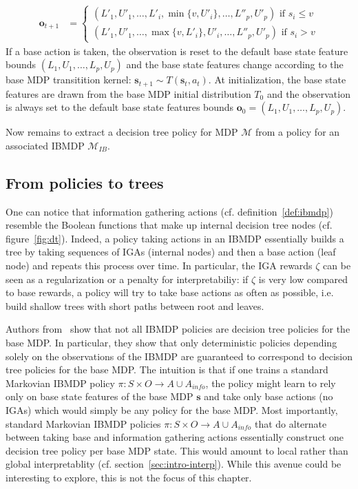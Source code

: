 \begin{definition}
\begin{itemize}
\begin{align*}
    \boldsymbol{o}_{t+1} &= \begin{cases}
        (L'_1, U'_1, \dots , L'_i, \min\{v, U'_i\}, \dots , L''_p, U'_p) \text{ if } s_i \leq v\\
        (L'_1, U'_1, \dots , \max\{v, L'_i\}, U'_i, \dots , L''_p, U'_p) \text{ if } s_i > v
    \end{cases}
\end{align*}
If a base action is taken, the observation is reset to the default base state feature bounds $(L_1, U_1,\dots, L_p, U_p)$ and the base state features change according to the base MDP transitition kernel: $\boldsymbol{s}_{t+1}\sim T(\boldsymbol{s}_t, a_t)$.
At initialization, the base state features are drawn from the base MDP initial distribution $T_0$ and the observation is always set to the default base state features bounds $\boldsymbol{o}_0=(L_1, U_1,\dots, L_p, U_p)$.
\end{itemize}
\end{definition}

Now remains to extract a decision tree policy for MDP $\mathcal{M}$ from a policy for an associated IBMDP $\mathcal{M}_{IB}$. 

\subsection{From policies to trees}

One can notice that information gathering actions (cf. definition~\ref{def:ibmdp}) resemble the Boolean functions that make up internal decision tree nodes (cf. figure~\ref{fig:dt}).
Indeed, a policy taking actions in an IBMDP essentially builds a tree by taking sequences of IGAs (internal nodes) and then a base action (leaf node) and repeats this process over time.
In particular, the IGA rewards $\zeta$ can be seen as a regularization or a penalty for interpretabiliy: if $\zeta$ is very low compared to base rewards, a policy will try to take base actions as often as possible, i.e. build shallow trees with short paths between root and leaves.

Authors from~\cite{topin2021iterative} show that not all IBMDP policies are decision tree policies for the base MDP.
In particular, they show that only deterministic policies depending solely on the observations of the IBMDP are guaranteed to correspond to decision tree policies for the base MDP.
The intuition is that if one trains a standard Markovian IBMDP policy $\pi:S\times O\rightarrow A\cup A_{info}$, the policy might learn to rely only on base state features of the base MDP $\boldsymbol{s}$ and take only base actions (no IGAs) which would simply be any policy for the base MDP.
Most importantly, standard Markovian IBMDP policies $\pi:S\times O\rightarrow A\cup A_{info}$ that do alternate between taking base and information gathering actions essentially construct one decision tree policy per base MDP state.
This would amount to local rather than global interpretablity (cf. section~\ref{sec:intro-interp}). While this avenue could be interesting to explore, this is not the focus of this chapter.

